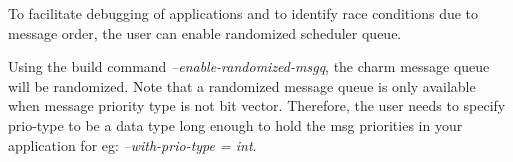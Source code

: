 To facilitate debugging of applications and to identify race conditions due to
message order, the user can enable randomized scheduler queue. 

Using the build command {\em --enable-randomized-msgq}, the charm message queue
will be randomized. Note that a randomized message queue is only available when
message priority type is not bit vector.  Therefore, the user needs to specify
prio-type to be a data type long enough to hold the msg priorities in your
application for eg: {\em --with-prio-type = int}.
